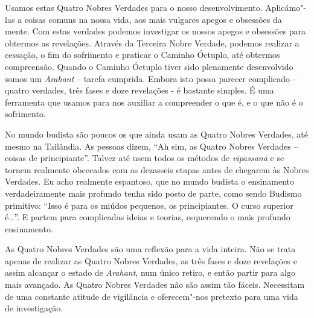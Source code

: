 Usamos estas Quatro Nobres Verdades para o nosso desenvolvimento. Aplicámo"-las a
coisas comuns na nossa vida, aos mais vulgares apegos e obsessões da mente. Com
estas verdades podemos investigar os nossos apegos e obsessões para obtermos as
revelações. Através da Terceira Nobre Verdade, podemos realizar a cessação, o
fim do sofrimento e praticar o Caminho Óctuplo, até obtermos compreensão.
Quando o Caminho Óctuplo tiver sido plenamente desenvolvido somos um
\emph{Arahant} – tarefa cumprida. Embora isto possa parecer complicado – quatro
verdades, três fases e doze revelações - é bastante simples. É uma ferramenta
que usamos para nos auxiliar a compreender o que é, e o que não é o sofrimento.

No mundo budista são poucos os que ainda usam as Quatro Nobres Verdades, até
mesmo na Tailândia. As pessoas dizem, “Ah sim, as Quatro Nobres Verdades –
coisas de principiante”. Talvez até usem todos os métodos de \emph{vipassanā} e
se tornem realmente obcecados com as dezasseis etapas antes de chegarem às
Nobres Verdades. Eu acho realmente espantoso, que no mundo budista o ensinamento
verdadeiramente mais profundo tenha sido posto de parte, como sendo Budismo
primitivo: “Isso é para os miúdos pequenos, os principiantes. O curso superior
é\ldots{}”. E partem para complicadas ideias e teorias, esquecendo o mais
profundo ensinamento.

As Quatro Nobres Verdades são uma reflexão para a vida inteira. Não se trata
apenas de realizar as Quatro Nobres Verdades, as três fases e doze revelações e
assim alcançar o estado de \emph{Arahant}, num único retiro, e então partir para
algo mais avançado. As Quatro Nobres Verdades não são assim tão fáceis.
Necessitam de uma constante atitude de vigilância e oferecem"-nos pretexto para
uma vida de investigação.

